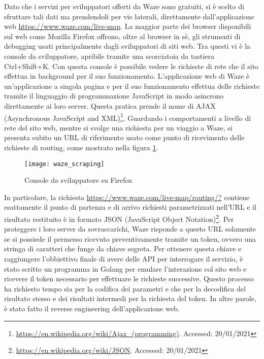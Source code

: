 Dato che i servizi per sviluppatori offerti da Waze sono gratuiti, si è scelto di sfruttare tali dati ma prendendoli per vie laterali, direttamente dall'applicazione web \url{https://www.waze.com/live-map}. La maggior parte dei browser disponibili sul web come Mozilla Firefox offrono, oltre al browser in sè, gli strumenti di debugging usati principalmente dagli sviluppatori di siti web. Tra questi vi è la console da sviluppatore, apribile tramite una scorciatoia da tastiera Ctrl+Shift+K. Con questa console è possibile vedere le richieste di rete che il sito effettua in background per il suo funzionamento. L'applicazione web di Waze è un'applicazione a singola pagina e per il suo funzionamento effettua delle richieste tramite il linguaggio di programmazione JavaScript in modo asincrono direttamente ai loro server. Questa pratica prende il nome di AJAX (Asynchronous JavaScript and XML)\footnote{\url{https://en.wikipedia.org/wiki/Ajax_(programming)}. Accessed: 20/01/2021}. Guardando i comportamenti a livello di rete del sito web, mentre si svolge una richiesta per un viaggio a Waze, si presenta subito un URL di riferimento usato come punto di ricevimento delle richieste di routing, come mostrato nella figura \ref{image:1}.

\begin{figure}[H]
	\texttt{[image: waze\_scraping]}
	\caption{Console da sviluppatore su Firefox}
	\label{image:1}
\end{figure}

In particolare, la richiesta \url{https://www.waze.com/live-map/routing/?} contiene esattamente il punto di partenza e di arrivo richiesti parametrizzati nell'URL e il risultato restituito è in formato JSON (JavaScript Object Notation)\footnote{\url{https://en.wikipedia.org/wiki/JSON}. Accessed: 20/01/2021}. Per proteggere i loro server da sovraccarichi, Waze risponde a questo URL solamente se si possiede il permesso ricevuto preventivamente tramite un token, ovvero una stringa di caratteri che funge da chiave segreta. Per ottenere questa chiave e raggiungere l'obbiettivo finale di avere delle API per interrogare il servizio, è stato scritto un programma in Golang per emulare l'interazione col sito web e ricevere il token necessario per effettuare le richieste successive. Questo processo ha richiesto tempo sia per la codifica dei parametri e che per la decodifica del risultato stesso e dei risultati intermedi per la richiesta del token. In altre parole, è stato fatto il reverse engineering dell'applicazione web.

